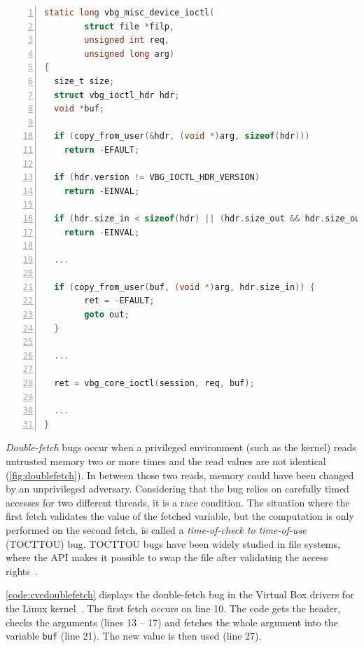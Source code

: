\documentclass[conference]{IEEEtran}
\begin{document}
\begin{minipage}{\linewidth}
  

\begin{lstlisting}[language=C, caption=Abridged CVE-2018-12633 Double Fetch in Linux,
                  label=code:cvedoublefetch,  breaklines=true
                  postbreak=\mbox{\textcolor{red}{$\hookrightarrow$}\space},
                  numbers=left,basicstyle=\scriptsize, xleftmargin=5.0ex]
static long vbg_misc_device_ioctl(
        struct file *filp,
        unsigned int req,
        unsigned long arg)
{
  size_t size;
  struct vbg_ioctl_hdr hdr;
  void *buf;

  if (copy_from_user(&hdr, (void *)arg, sizeof(hdr))) 
    return -EFAULT;
  
  if (hdr.version != VBG_IOCTL_HDR_VERSION) 
    return -EINVAL;
   
  if (hdr.size_in < sizeof(hdr) || (hdr.size_out && hdr.size_out < sizeof(hdr)))
    return -EINVAL;
  
  ...
  
  if (copy_from_user(buf, (void *)arg, hdr.size_in)) {
		ret = -EFAULT;
		goto out;
  }

  ...

  ret = vbg_core_ioctl(session, req, buf);

  ...
}
\end{lstlisting}
\end{minipage}
\emph{Double-fetch} bugs occur when a privileged environment (such as the
kernel) reads untrusted memory two or more times and the read values are not
identical (\autoref{fig:doublefetch}). In between those two reads, memory could
have been changed by an unprivileged adversary. Considering that the bug relies
on carefully timed accesses for two different threads, it is a race
condition. The situation where the first fetch validates the value of the
fetched variable, but the computation is only performed on the second fetch, is
called a \emph{time-of-check to time-of-use} (TOCTTOU) bug. TOCTTOU bugs have
been widely studied in file systems, where the API makes it possible to swap the
file after validating the access rights~\cite{payer2012protecting,
pu2006methodical, wei2010modeling, tsafrir2008portably}.

\autoref{code:cvedoublefetch} displays the double-fetch bug in the Virtual Box
drivers for the Linux kernel~\cite{cve201812633}. The first fetch occurs on line
10. The code gets the header, checks the arguments (lines 13 -- 17)
and fetches the whole argument into the variable \texttt{buf} (line 21). The new
value is then used (line 27).
\end{document}
